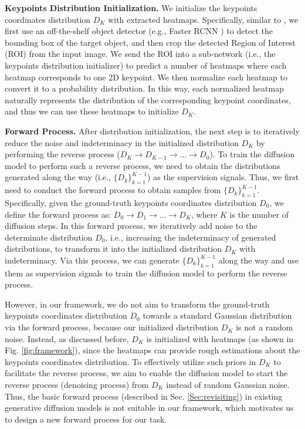 \documentclass[10pt,twocolumn,letterpaper]{article}
\begin{document}
\noindent\textbf{Keypoints Distribution Initialization.} 
We initialize the keypoints coordinates distribution $D_K$ with extracted heatmaps.
Specifically, similar to \cite{su2022zebrapose, li2019cdpn, labbe2020cosypose}, we first use an off-the-shelf object detector (e.g., Faster RCNN \cite{ren2015faster}) to detect the bounding box of the target object, and then crop the detected Region of Interest (ROI) from the input image.
We send the ROI into a sub-network (i.e., the keypoints distribution initializer) to predict a number of heatmaps where each heatmap corresponds to one 2D keypoint.
We then normalize each heatmap to convert it to a probability distribution.
In this way, each normalized heatmap naturally represents the distribution of the corresponding keypoint coordinates, and thus
we can use these heatmaps to initialize $D_K$.

\noindent\textbf{Forward Process.} 
After distribution initialization, the next step is to iteratively reduce the noise and indeterminacy in the initialized distribution $D_K$ by performing the reverse process ($D_K \rightarrow D_{K-1} \rightarrow ... \rightarrow D_0$). 
To train the diffusion model to perform such a reverse process, we need to obtain the distributions generated along the way
(i.e., $\{D_k\}^{K-1}_{k=1}$) as the supervision signals.
Thus, we first need to conduct the forward process to obtain samples from $\{D_k\}^{K-1}_{k=1}$.
Specifically, given the ground-truth keypoints coordinates distribution $D_0$, we define the forward process as: $D_0 \rightarrow D_1 \rightarrow ... \rightarrow D_K$, where $K$ is the number of diffusion steps.
In this forward process, we iteratively add noise to the determinate distribution $D_0$, i.e., increasing the indeterminacy of generated distributions, to transform it into the initialized distribution $D_K$ with indeterminacy.   
Via this process, we can generate $\{D_k\}^{K-1}_{k=1}$ along the way and use them as supervision signals to train the diffusion model to perform the reverse process.

However, in our framework, we do not aim to transform the ground-truth keypoints coordinates distribution $D_0$ towards a standard Gaussian distribution via the forward process, 
because our initialized distribution $D_K$ is not a random noise.
Instead, as discussed before, $D_K$ is initialized with heatmaps (as shown in Fig. \ref{fig:framework}), since the heatmaps can provide rough estimations about the keypoints coordinates distribution. 
To effectively utilize such priors in $D_K$ to facilitate the reverse process, we aim to enable the diffusion model to start the reverse process (denoising process) from $D_K$ instead of random Gaussian noise.  
Thus, the basic forward process (described in Sec. \ref{Sec:revisiting}) in existing generative diffusion models is not suitable in our framework, which motivates us to design a new forward process for our task.
\end{document}

